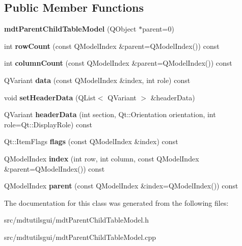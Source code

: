 \subsection*{Public Member Functions}
\begin{DoxyCompactItemize}
\item 
\hypertarget{classmdt_parent_child_table_model_a6a02b85f8663bd913b23380381287c0b}{
{\bfseries mdtParentChildTableModel} (QObject $\ast$parent=0)}
\label{classmdt_parent_child_table_model_a6a02b85f8663bd913b23380381287c0b}

\item 
\hypertarget{classmdt_parent_child_table_model_a00ede0aa95a181c04aafffa56bd8f470}{
int {\bfseries rowCount} (const QModelIndex \&parent=QModelIndex()) const }
\label{classmdt_parent_child_table_model_a00ede0aa95a181c04aafffa56bd8f470}

\item 
\hypertarget{classmdt_parent_child_table_model_a6d1941603fde6be4942439f22616249e}{
int {\bfseries columnCount} (const QModelIndex \&parent=QModelIndex()) const }
\label{classmdt_parent_child_table_model_a6d1941603fde6be4942439f22616249e}

\item 
\hypertarget{classmdt_parent_child_table_model_aea9349919cafde88c33aa6ff8c68f4ff}{
QVariant {\bfseries data} (const QModelIndex \&index, int role) const }
\label{classmdt_parent_child_table_model_aea9349919cafde88c33aa6ff8c68f4ff}

\item 
\hypertarget{classmdt_parent_child_table_model_a639b9f817d3c67e913c1e758ceb15f12}{
void {\bfseries setHeaderData} (QList$<$ QVariant $>$ \&headerData)}
\label{classmdt_parent_child_table_model_a639b9f817d3c67e913c1e758ceb15f12}

\item 
\hypertarget{classmdt_parent_child_table_model_ac0fe230365b4685729886eb89c3bee2d}{
QVariant {\bfseries headerData} (int section, Qt::Orientation orientation, int role=Qt::DisplayRole) const }
\label{classmdt_parent_child_table_model_ac0fe230365b4685729886eb89c3bee2d}

\item 
\hypertarget{classmdt_parent_child_table_model_ad937c815fb4d3afdd7bf6a222e216b2c}{
Qt::ItemFlags {\bfseries flags} (const QModelIndex \&index) const }
\label{classmdt_parent_child_table_model_ad937c815fb4d3afdd7bf6a222e216b2c}

\item 
\hypertarget{classmdt_parent_child_table_model_abd2bd46910ca92c7b92ff24593bfa4d1}{
QModelIndex {\bfseries index} (int row, int column, const QModelIndex \&parent=QModelIndex()) const }
\label{classmdt_parent_child_table_model_abd2bd46910ca92c7b92ff24593bfa4d1}

\item 
\hypertarget{classmdt_parent_child_table_model_aa4827005e9009f1b0fddf4ae962d6031}{
QModelIndex {\bfseries parent} (const QModelIndex \&index=QModelIndex()) const }
\label{classmdt_parent_child_table_model_aa4827005e9009f1b0fddf4ae962d6031}

\end{DoxyCompactItemize}


The documentation for this class was generated from the following files:\begin{DoxyCompactItemize}
\item 
src/mdtutilsgui/mdtParentChildTableModel.h\item 
src/mdtutilsgui/mdtParentChildTableModel.cpp\end{DoxyCompactItemize}
